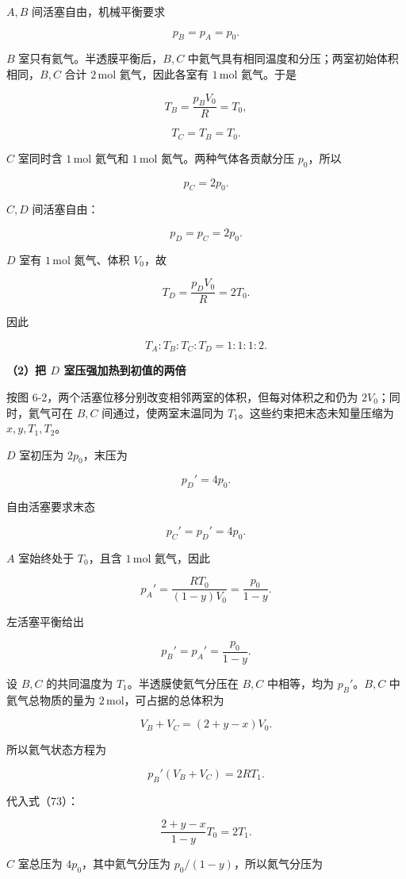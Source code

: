 \documentclass[12pt,a4paper,UTF8]{ctexart}
\begin{document}
\(A,B\) 间活塞自由，机械平衡要求

\[p_B=p_A=p_0.\]

\(B\) 室只有氦气。半透膜平衡后，\(B,C\)
中氦气具有相同温度和分压；两室初始体积相同，\(B,C\) 合计
\(2\,\mathrm{mol}\) 氦气，因此各室有 \(1\,\mathrm{mol}\) 氦气。于是

\[T_B=\frac{p_BV_0}{R}=T_0,\]

\[T_C=T_B=T_0.\]

\(C\) 室同时含 \(1\,\mathrm{mol}\) 氦气和 \(1\,\mathrm{mol}\)
氮气。两种气体各贡献分压 \(p_0\)，所以

\[p_C=2p_0.\]

\(C,D\) 间活塞自由：

\[p_D=p_C=2p_0.\]

\(D\) 室有 \(1\,\mathrm{mol}\) 氮气、体积 \(V_0\)，故

\[T_D=\frac{p_DV_0}{R}=2T_0.\]

因此

\[\boxed{T_A:T_B:T_C:T_D=1:1:1:2}. \tag{71}\]

\textbf{（2）把 \(D\) 室压强加热到初值的两倍}

按图 6-2，两个活塞位移分别改变相邻两室的体积，但每对体积之和仍为
\(2V_0\)；同时，氦气可在 \(B,C\) 间通过，使两室末温同为
\(T_1\)。这些约束把末态未知量压缩为 \(x,y,T_1,T_2\)。

\(D\) 室初压为 \(2p_0\)，末压为

\[p_D'=4p_0.\]

自由活塞要求末态

\[p_C'=p_D'=4p_0. \tag{72}\]

\(A\) 室始终处于 \(T_0\)，且含 \(1\,\mathrm{mol}\) 氦气，因此

\[p_A'=\frac{RT_0}{(1-y)V_0}=\frac{p_0}{1-y}.\]

左活塞平衡给出

\[p_B'=p_A'=\frac{p_0}{1-y}. \tag{73}\]

设 \(B,C\) 的共同温度为 \(T_1\)。半透膜使氦气分压在 \(B,C\) 中相等，均为
\(p_B'\)。\(B,C\) 中氦气总物质的量为
\(2\,\mathrm{mol}\)，可占据的总体积为

\[V_B+V_C=(2+y-x)V_0.\]

所以氦气状态方程为

\[p_B'(V_B+V_C)=2RT_1.\]

代入式（73）：

\[\boxed{\frac{2+y-x}{1-y}T_0=2T_1}. \tag{74}\]

\(C\) 室总压为 \(4p_0\)，其中氦气分压为 \(p_0/(1-y)\)，所以氮气分压为
\end{document}
